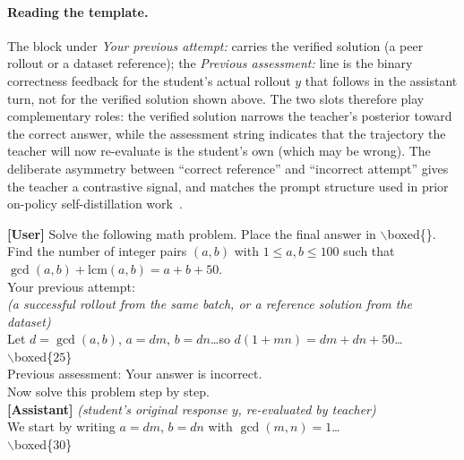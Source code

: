 \documentclass{article}
\begin{document}
\paragraph{Reading the template.} The block under \emph{Your previous attempt:} carries the verified solution (a peer rollout or a dataset reference); the \emph{Previous assessment:} line is the binary correctness feedback for the student's actual rollout $y$ that follows in the assistant turn, not for the verified solution shown above. The two slots therefore play complementary roles: the verified solution narrows the teacher's posterior toward the correct answer, while the assessment string indicates that the trajectory the teacher will now re-evaluate is the student's own (which may be wrong). The deliberate asymmetry between ``correct reference'' and ``incorrect attempt'' gives the teacher a contrastive signal, and matches the prompt structure used in prior on-policy self-distillation work~\citep{sdpo,opsd}.

\begin{tcolorbox}[breakable,colback=gray!3,colframe=gray!50,title={\small Math (AIME / HMMT / MinervaMath) --- self-teacher context},fonttitle=\bfseries\small,boxrule=0.5pt,arc=2pt,left=4pt,right=4pt,top=2pt,bottom=2pt]
  \small\ttfamily
  {\color{sysblue}\textbf{[User]}} {\color{sysblue}Solve the following math problem. Place the final answer in $\backslash$boxed\{\}.}\\
  {\color{sysblue}Find the number of integer pairs $(a,b)$ with $1 \le a,b \le 100$ such that $\gcd(a,b)+\mathrm{lcm}(a,b)=a+b+50$.}\\[3pt]
  Your previous attempt:\\
  \textrm{\textit{(a successful rollout from the same batch, or a reference solution from the dataset)}}\\
  Let $d=\gcd(a,b)$, $a=dm$, $b=dn$\ldots so $d(1+mn)=dm+dn+50$\ldots\\
  $\backslash$boxed\{$25$\}\\[3pt]
  {\color{fbredcolor}Previous assessment: Your answer is incorrect.}\\[3pt]
  Now solve this problem step by step.\\[3pt]
  {\color{respgreen}\textbf{[Assistant]}} {\color{respgreen}\textit{(student's original response $y$, re-evaluated by teacher)}}\\
  {\color{respgreen}We start by writing $a=dm$, $b=dn$ with $\gcd(m,n)=1$\ldots}\\
  {\color{respgreen}$\backslash$boxed\{$30$\}}
\end{tcolorbox}
\end{document}
